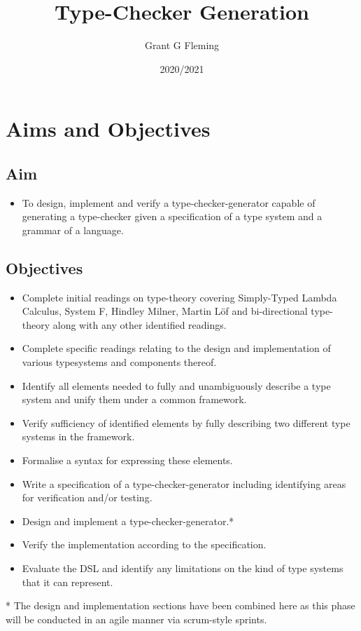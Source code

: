 \documentclass{ProgressReport}[2020/09/15]
\title{Type-Checker Generation}
\author{Grant G Fleming}
\date{2020/2021}
\begin{document}
        \maketitle
	\tableofcontents
        
        \chapter{Aims and Objectives}

        \section{Aim}

        \begin{itemize}
          \item To design, implement and verify a
            type-checker-generator capable of generating a
            type-checker given a specification of a type system and a
            grammar of a language. 
        \end{itemize}
        
        \section{Objectives}

        \begin{itemize}
          \item Complete initial readings on type-theory covering
            Simply-Typed Lambda Calculus, System F, Hindley Milner,
            Martin L\"{o}f and bi-directional type-theory along with
            any other identified readings.
          \item Complete specific readings relating to the design and
            implementation of various typesystems and components thereof.
          \item Identify all elements needed to fully and
            unambiguously describe a type system and unify them under
            a common framework.
          \item Verify sufficiency of identified elements by fully describing
            two different type systems in the framework.
          \item Formalise a syntax for expressing these elements.
          \item Write a specification of a type-checker-generator
            including identifying areas for verification and/or
            testing. 
          \item Design and implement a type-checker-generator.*
          \item Verify the implementation according to the
            specification.
          \item Evaluate the DSL and identify any limitations on the
            kind of type systems that it can represent.
        \end{itemize}
        \vspace{1em}
        \hline
        \vspace{1em}
        * The design and implementation sections have been combined
        here as this phase will be conducted in an agile manner via
        scrum-style sprints.
        
\end{document}
